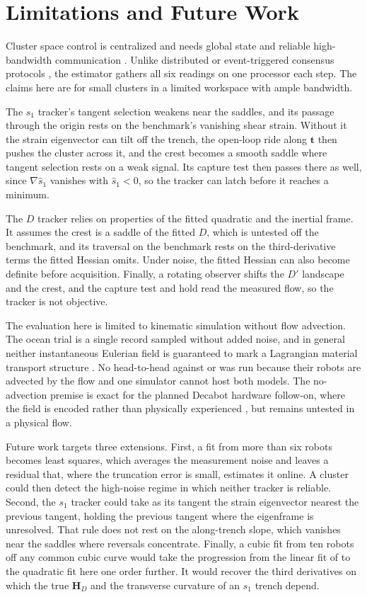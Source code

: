\documentclass[lettersize,journal]{IEEEtran}
\begin{document}
\section{Limitations and Future Work}
\label{sec:disc_limits}

Cluster space control is centralized and needs global state and reliable
high-bandwidth communication \cite{30}. Unlike distributed or
event-triggered consensus protocols \cite{35}, the estimator gathers all six
readings on one processor each step. The claims here are for small clusters
in a limited workspace with ample bandwidth.

The $s_1$ tracker's tangent selection weakens near the saddles, and its
passage through the origin rests on the benchmark's vanishing shear
strain. Without it the strain eigenvector
can tilt off the trench, the open-loop ride along $\mathbf{t}$ then
pushes the cluster across it, and the crest becomes a smooth saddle where
tangent selection rests on a weak signal. Its capture test then passes
there as well, since $\nabla\hat{s}_1$ vanishes with $\hat{s}_1 < 0$, so
the tracker can latch before it reaches a minimum.

The $D$ tracker relies on properties of the fitted quadratic and the
inertial frame. It assumes the crest is a saddle of the fitted $D$, which
is untested off the benchmark, and its traversal on the benchmark rests on
the third-derivative terms the fitted Hessian omits. Under noise, the
fitted Hessian can also become definite before acquisition. Finally, a
rotating observer shifts the $D'$ landscape and the crest, and the capture
test and hold read the measured flow, so the tracker is not objective.

The evaluation here is limited to kinematic simulation without flow
advection. The ocean trial is a single record sampled without added noise,
and in general neither instantaneous Eulerian field is guaranteed to mark a
Lagrangian material transport structure \cite{18}. No head-to-head against
\cite{26,27,28} or \cite{29} was run because their robots are advected by
the flow and one simulator cannot host both models. The no-advection
premise is exact for the planned Decabot hardware follow-on, where the
field is encoded rather than physically experienced \cite{32}, but remains
untested in a physical flow.

Future work targets three extensions. First, a fit from more than six
robots becomes least squares, which averages the measurement noise and
leaves a residual that, where the truncation error is small, estimates
it online. A cluster could then detect the
high-noise regime in which neither tracker is reliable. Second, the
$s_1$ tracker could take as its tangent the strain eigenvector nearest the
previous tangent, holding the previous tangent where the eigenframe is
unresolved. That rule does not rest on the along-trench slope, which
vanishes near the saddles where reversals concentrate. Finally, a cubic fit
from ten robots off any common cubic curve would take the progression from
the linear fit of \cite{10} to the quadratic fit here one order further. It
would recover the third derivatives on which the true $\mathbf{H}_D$ and
the transverse curvature of an $s_1$ trench depend.
\end{document}
